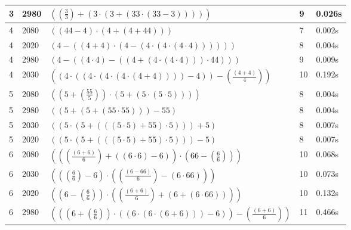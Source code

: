 \documentclass{article}
\theoremstyle{nonumberplain}
\begin{document}
\begin{center}
\begin{longtable}{ | l | l | p{9.5cm} | l | l | }
        3 & 2980 & \( \left(\left(\frac{3}{3}\right) + \left(3 \cdot \left(3 + \left(33 \cdot \left(33 - 3\right)\right)\right)\right)\right) \) & 9 & 0.026s \\\hline
        4 & 2080 & \( \left(\left(44 - 4\right) \cdot \left(4 + \left(4 + 44\right)\right)\right) \) & 7 & 0.002s \\\hline
        4 & 2020 & \( \left(4 - \left(\left(4 + 4\right) \cdot \left(4 - \left(4 \cdot \left(4 \cdot \left(4 \cdot 4\right)\right)\right)\right)\right)\right) \) & 8 & 0.004s \\\hline
        4 & 2980 & \( \left(4 - \left(\left(4 \cdot 4\right) - \left(\left(4 + \left(4 \cdot \left(4 \cdot 4\right)\right)\right) \cdot 44\right)\right)\right) \) & 9 & 0.009s \\\hline
        4 & 2030 & \( \left(\left(4 \cdot \left(\left(4 \cdot \left(4 \cdot \left(4 \cdot \left(4 + 4\right)\right)\right)\right) - 4\right)\right) - \left(\frac{\left(4 + 4\right)}{4}\right)\right) \) & 10 & 0.192s \\\hline
        5 & 2080 & \( \left(\left(5 + \left(\frac{55}{5}\right)\right) \cdot \left(5 + \left(5 \cdot \left(5 \cdot 5\right)\right)\right)\right) \) & 8 & 0.004s \\\hline
        5 & 2980 & \( \left(\left(5 + \left(5 + \left(55 \cdot 55\right)\right)\right) - 55\right) \) & 8 & 0.004s \\\hline
        5 & 2030 & \( \left(\left(5 \cdot \left(5 + \left(\left(\left(5 \cdot 5\right) + 55\right) \cdot 5\right)\right)\right) + 5\right) \) & 8 & 0.007s \\\hline
        5 & 2020 & \( \left(\left(5 \cdot \left(5 + \left(\left(\left(5 \cdot 5\right) + 55\right) \cdot 5\right)\right)\right) - 5\right) \) & 8 & 0.007s \\\hline
        6 & 2080 & \( \left(\left(\left(\frac{\left(6 + 6\right)}{6}\right) + \left(\left(6 \cdot 6\right) - 6\right)\right) \cdot \left(66 - \left(\frac{6}{6}\right)\right)\right) \) & 10 & 0.068s \\\hline
        6 & 2030 & \( \left(\left(\left(\frac{6}{6}\right) - 6\right) \cdot \left(\left(\frac{\left(6 - 66\right)}{6}\right) - \left(6 \cdot 66\right)\right)\right) \) & 10 & 0.073s \\\hline
        6 & 2020 & \( \left(\left(6 - \left(\frac{6}{6}\right)\right) \cdot \left(\left(\frac{\left(6 + 6\right)}{6}\right) + \left(6 + \left(6 \cdot 66\right)\right)\right)\right) \) & 10 & 0.132s \\\hline
        6 & 2980 & \( \left(\left(\left(6 + \left(\frac{6}{6}\right)\right) \cdot \left(\left(6 \cdot \left(6 \cdot \left(6 + 6\right)\right)\right) - 6\right)\right) - \left(\frac{\left(6 + 6\right)}{6}\right)\right) \) & 11 & 0.466s \\\hline

\end{longtable}
\end{center}
\end{document}
